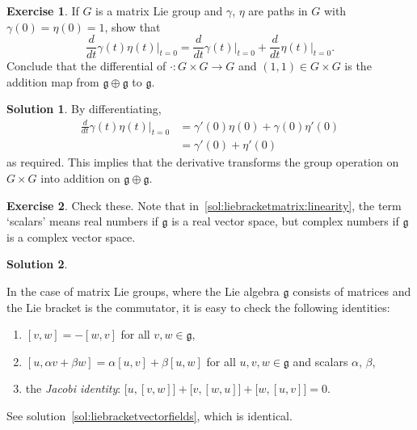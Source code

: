 \documentclass[11pt, a4paper]{report}
\theoremstyle{definition}
\newtheorem{exercise}{Exercise}[part]
\newtheorem{solution}{Solution}[part]
\newenvironment{ex}{\begin{exercise}}{\end{exercise}\pagebreak[1]}
\newenvironment{sol}{\begin{solution}}{\end{solution}\pagebreak[3]}
\begin{document}
\begin{ex}

If $G$ is a matrix Lie group and $\gamma$, $\eta$ are paths in $G$ with $\gamma(0) = \eta(0) = 1$, show that
\[
    \frac{d}{dt} \gamma(t) \eta(t) \Big|_{t = 0}
        = \frac{d}{dt} \gamma(t) \Big|_{t = 0}
          +\frac{d}{dt} \eta(t) \Big|_{t = 0}.
\]
Conclude that the differential of $\cdot : G \times G \to G$ and $(1, 1) \in G \times G$ is the addition map from $\mathfrak{g} \oplus \mathfrak{g}$ to $\mathfrak{g}$.

\end{ex}

\begin{sol}

By differentiating,
\begin{align*}
    \frac{d}{dt} \gamma(t) \eta(t) \Big|_{t = 0}
        &= \gamma'(0) \eta(0) + \gamma(0) \eta'(0) \\
        &= \gamma'(0) + \eta'(0)
\end{align*}
as required.
This implies that the derivative transforms the group operation on $G \times G$ into addition on $\mathfrak{g} \oplus \mathfrak{g}$.

\end{sol}

\begin{ex}

Check these. Note that in~\ref{sol:liebracketmatrix:linearity}, the term `scalars' means real numbers if $\mathfrak{g}$ is a real vector space, but complex numbers if $\mathfrak{g}$ is a complex vector space.

\end{ex}

\begin{sol}\label{sol:liebracketmatrix}

In the case of matrix Lie groups, where the Lie algebra $\mathfrak{g}$ consists of matrices and the Lie bracket is the commutator, it is easy to check the following identities:
\begin{enumerate}
    \item $[v, w] = -[w, v]$ for all $v, w \in \mathfrak{g}$,\label{sol:liebracketmatrix:anticommutativity}
    \item $[u, \alpha v + \beta w] = \alpha [u, v] + \beta [u, w]$
          for all $u, v, w \in \mathfrak{g}$ and scalars $\alpha$, $\beta$,\label{sol:liebracketmatrix:linearity}
    \item the \emph{Jacobi identity}: $\big[u, [v, w]\big] + \big[v, [w, u]\big] + \big[w, [u, v]\big] = 0$.\label{sol:liebracketmatrix:jacobiidentity}
\end{enumerate}

See solution~\ref{sol:liebracketvectorfields}, which is identical.

\end{sol}
\end{document}
